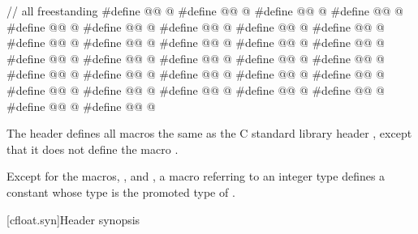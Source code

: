 %
\begin{codeblock}
// all freestanding
#define @@ @\seebelow@
#define @@ @\seebelow@
#define @@ @\seebelow@
#define @@ @\seebelow@
#define @@ @\seebelow@
#define @@ @\seebelow@
#define @@ @\seebelow@
#define @@ @\seebelow@
#define @@ @\seebelow@
#define @@ @\seebelow@
#define @@ @\seebelow@
#define @@ @\seebelow@
#define @@ @\seebelow@
#define @@ @\seebelow@
#define @@ @\seebelow@
#define @@ @\seebelow@
#define @@ @\seebelow@
#define @@ @\seebelow@
#define @@ @\seebelow@
#define @@ @\seebelow@
#define @@ @\seebelow@
#define @@ @\seebelow@
#define @@ @\seebelow@
#define @@ @\seebelow@
#define @@ @\seebelow@
#define @@ @\seebelow@
#define @@ @\seebelow@
#define @@ @\seebelow@
#define @@ @\seebelow@
#define @@ @\seebelow@
#define @@ @\seebelow@
\end{codeblock}

\pnum
The header  defines all macros the same as
the C standard library header ,
except that it does not define the macro .
\begin{note}
Except for the  macros, , and ,
a macro referring to
an integer type  defines a constant whose type is the promoted
type of .
\end{note}


[cfloat.syn]{Header  synopsis}

